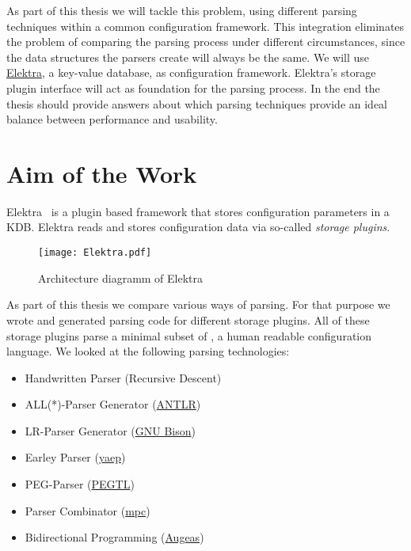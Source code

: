 As part of this thesis we will tackle this problem, using different parsing techniques within a common configuration framework. This integration eliminates the problem of comparing the parsing process under different circumstances, since the data structures the parsers create will always be the same. We will use \href{http://web.libelektra.org}{Elektra}, a key-value database, as configuration framework. Elektra’s storage plugin interface will act as foundation for the parsing process. In the end the thesis should provide answers about which parsing techniques provide an ideal balance between performance and usability.

\section{Aim of the Work}
\label{sec:aim_of_the_work}

Elektra~\cite{raab2010modular, raab2017context} is a plugin based framework that stores configuration parameters in a \glsdesc{KDB}. Elektra reads and stores configuration data via so-called \emph{storage plugins}.

\begin{figure}[H]
  \centering
    \texttt{[image: Elektra.pdf]}
  \caption{Architecture diagramm of Elektra}
\end{figure}

As part of this thesis we compare various ways of parsing. For that purpose we wrote and generated parsing code for different storage plugins. All of these storage plugins parse a minimal subset of , a human readable configuration language. We looked at the following parsing technologies:

\begin{itemize}
  \item Handwritten Parser (Recursive Descent)
  \item ALL(*)-Parser Generator (\href{http://www.antlr.org}{ANTLR})
  \item LR-Parser Generator (\href{https://www.gnu.org/software/bison}{GNU Bison})
  \item Earley Parser (\href{https://github.com/vnmakarov/yaep}{yaep})
  \item PEG-Parser (\href{https://github.com/ColinH/PEGTL}{PEGTL})
  \item Parser Combinator (\href{https://github.com/orangeduck/mpc}{mpc})
  \item Bidirectional Programming (\href{http://augeas.net}{Augeas})
\end{itemize}

